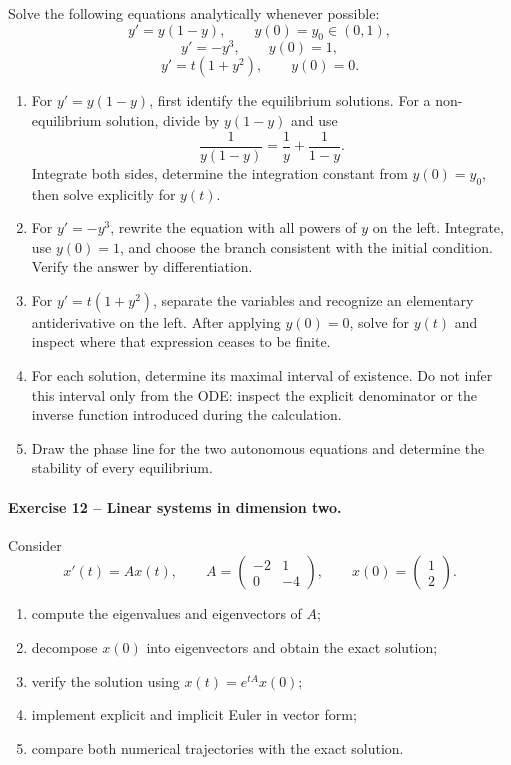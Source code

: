 \documentclass[10pt]{article}
\begin{document}
Solve the following equations analytically whenever possible:
\[
y'=y(1-y),\qquad y(0)=y_0\in(0,1),
\]
\[
y'=-y^3,\qquad y(0)=1,
\]
\[
y'=t(1+y^2),\qquad y(0)=0.
\]
\begin{enumerate}
\item For $y'=y(1-y)$, first identify the equilibrium solutions. For a
non-equilibrium solution, divide by $y(1-y)$ and use
\[
\frac{1}{y(1-y)}=\frac1y+\frac1{1-y}.
\]
Integrate both sides, determine the integration constant from $y(0)=y_0$,
then solve explicitly for $y(t)$.
\item For $y'=-y^3$, rewrite the equation with all powers of $y$ on the
left. Integrate, use $y(0)=1$, and choose the branch consistent with the
initial condition. Verify the answer by differentiation.
\item For $y'=t(1+y^2)$, separate the variables and recognize an elementary
antiderivative on the left. After applying $y(0)=0$, solve for $y(t)$ and
inspect where that expression ceases to be finite.
\item For each solution, determine its maximal interval of existence. Do not
infer this interval only from the ODE: inspect the explicit denominator or
the inverse function introduced during the calculation.
\item Draw the phase line for the two autonomous equations and determine
the stability of every equilibrium.
\end{enumerate}

\paragraph{Exercise 12 -- Linear systems in dimension two.}
Consider
\[
x'(t)=Ax(t),
\qquad
A=\begin{pmatrix}-2&1\\0&-4\end{pmatrix},
\qquad
x(0)=\begin{pmatrix}1\\2\end{pmatrix}.
\]
\begin{enumerate}
\item compute the eigenvalues and eigenvectors of $A$;
\item decompose $x(0)$ into eigenvectors and obtain the exact solution;
\item verify the solution using $x(t)=e^{tA}x(0)$;
\item implement explicit and implicit Euler in vector form;
\item compare both numerical trajectories with the exact solution.
\end{enumerate}
\end{document}
